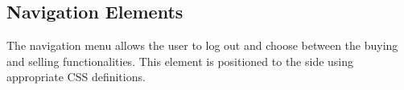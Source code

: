 \documentclass[12pt, a4paper, renqo, final]{amsart}
\begin{document}
				\noindent {}
				\newpage
				
			\subsection{Navigation Elements}
				The navigation menu allows the user to log out and choose between the buying and selling functionalities. This element is positioned to the side using appropriate CSS definitions.
				\begin{figure}[h]
					\noindent {}
				\end{figure}
				\phantom{.}
\end{document}
